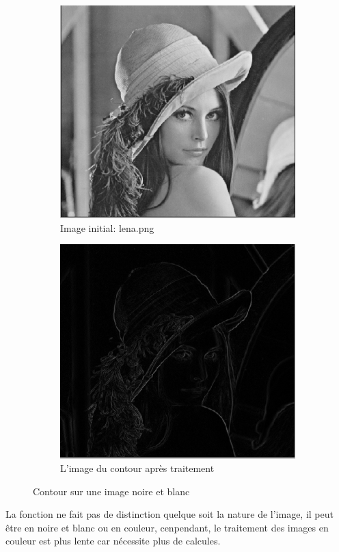 \documentclass[12pt, letterpaper]{article}
\begin{document}
\begin{figure}[h!]
    \centering
    \begin{subfigure}[b]{0.7\linewidth}
      \includegraphics[width=\linewidth]{img/fig5.PNG}
      \caption{Image initial: lena.png}
    \end{subfigure}
    \begin{subfigure}[b]{0.7\linewidth}
      \includegraphics[width=\linewidth]{img/fig6.PNG}
      \caption{L'image du contour après traitement}
    \end{subfigure}
    \caption{Contour sur une image noire et blanc}
    \label{fig:contour1}
\end{figure}
La fonction ne fait pas de distinction quelque soit la nature de l'image, il peut être en noire et blanc ou en couleur,
 cenpendant, le traitement des images en couleur est plus lente car nécessite plus de calcules.
\end{document}
